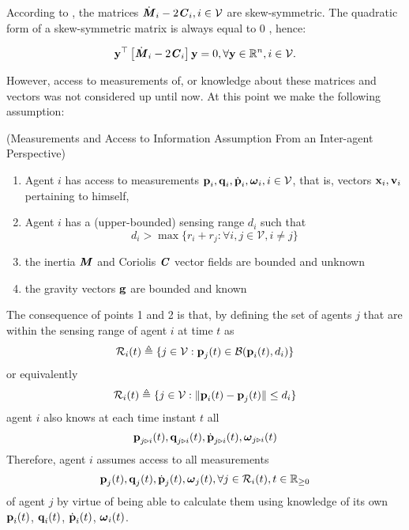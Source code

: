 \begin{bw_box}
  \begin{remark}
    According to \cite{Siciliano2009}, the matrices
    $\dot{\bm{\mathit{M}}}_i - 2\bm{\mathit{C}}_i, i \in \mathcal{V}$ are skew-symmetric.
    The quadratic form of a skew-symmetric matrix is always equal to 0
    \cite{horn_jonshon}, hence:

    \begin{equation}
      \bm{\mathbf{y}}^\top \left[\dot{\bm{\mathit{M}}}_i - 2 \bm{\mathit{C}}_i\right]\bm{\mathbf{y}} = 0,
        \forall \bm{\mathbf{y}} \in \mathbb{R}^n, i \in \mathcal{V}.
    \label{eq:skew_symm}
    \end{equation}
  \end{remark}
\end{bw_box}

However, access to measurements of, or knowledge about these matrices and
vectors was not considered up until now. At this point we make the following
assumption:

\begin{gg_box}
\begin{assumption} (Measurements and Access to Information Assumption From an
  Inter-agent Perspective)
  \begin{enumerate}

    \item Agent $i$ has access to measurements
      $\bm{\mathbf{p}}_i, \bm{\mathbf{q}}_i, \dot{\bm{\mathbf{p}}}_i, \bm{\mathbf{\omega}}_i, i\in\mathcal{V}$,
      that is, vectors $\bm{\mathbf{x}}_i, \bm{\mathbf{v}}_i$ pertaining to himself,

    \item Agent $i$ has a (upper-bounded) sensing range $d_i$ such that
      $$d_i > \max\{r_i + r_j : \forall i,j \in \mathcal{V}, i \neq j\}$$

    \item the inertia $\bm{\mathit{M}}$ and Coriolis $\bm{\mathit{C}}$ vector fields are
      bounded and unknown

    \item the gravity vectors $\bm{\mathbf{g}}$ are bounded and known

  \end{enumerate}
  \label{ass:measurements_access}
\end{assumption}
\end{gg_box}

The consequence of points 1 and 2 is that, by defining the set of
agents $j$ that are within the sensing range of agent $i$ at time $t$ as
$$\mathcal{R}_i(t) \triangleq \{j\in\mathcal{V} : \bm{\mathbf{p}}_j(t)\in\mathcal{B}(\bm{\mathbf{p}}_i(t), d_i)\}$$
or equivalently
$$\mathcal{R}_i(t) \triangleq \{j\in\mathcal{V} : \| \bm{\mathbf{p}}_i(t) - \bm{\mathbf{p}}_j(t) \| \leq d_i\}$$
agent $i$ also knows at each time instant $t$ all
$$\bm{\mathbf{p}}_{j \triangleright i}(t), \bm{\mathbf{q}}_{j \triangleright i}(t),
\dot{\bm{\mathbf{p}}}_{j \triangleright i}(t), \bm{\mathbf{\omega}}_{j \triangleright i}(t)$$
Therefore, agent $i$ assumes access to all measurements
$$\bm{\mathbf{p}}_{j}(t), \bm{\mathbf{q}}_{j}(t), \dot{\bm{\mathbf{p}}}_j(t),
\bm{\mathbf{\omega}}_j(t), \forall j\in \mathcal{R}_i(t),t\in\mathbb{R}_{\geq 0}$$
of agent $j$ by virtue of being able to calculate them using knowledge of its own
$\bm{\mathbf{p}}_i(t)$, $\bm{\mathbf{q}}_i(t)$, $\dot{\bm{\mathbf{p}}}_i(t)$, $\bm{\mathbf{\omega}}_i(t)$.



